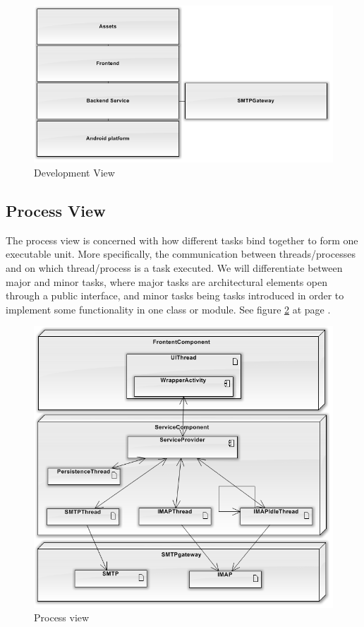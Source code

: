 \begin{figure}
	\includegraphics[width=\textwidth]{developmentview.png}
	\caption{Development View}
	\label{fig:developmentview}
\end{figure}

\subsection{Process View}
The process view is concerned with how different tasks bind together to form one executable unit. More specifically, the communication between threads/processes and on which thread/process is a task executed. We will differentiate between major and minor tasks, where major tasks are architectural elements open through a public interface, and minor tasks being tasks introduced in order to implement some functionality in one class or module.
See figure \ref{fig:processview} at page \pageref{fig:processview}.

\begin{figure}
	\includegraphics[width=\textwidth]{processview.png}
	\caption{Process view}
	\label{fig:processview}
\end{figure}

